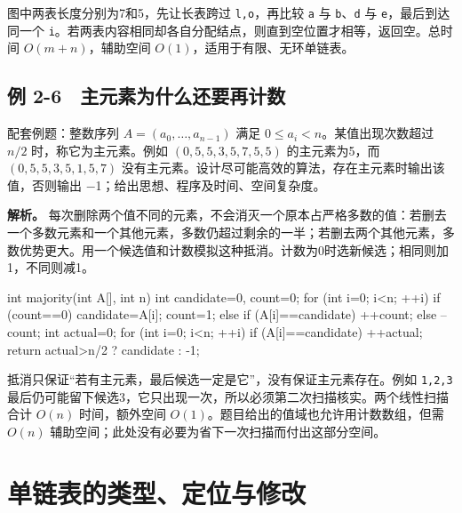 图中两表长度分别为7和5，先让长表跨过 \texttt{l,\allowbreak{}o}，再比较 \texttt{a} 与 \texttt{b}、\texttt{d} 与 \texttt{e}，最后到达同一个 \texttt{i}。若两表内容相同却各自分配结点，则直到空位置才相等，返回空。总时间 \(O(m+n)\)，辅助空间 \(O(1)\)，适用于有限、无环单链表。

\subsection{例 2-6　主元素为什么还要再计数}\label{DS02-ex6}

\begin{example}[配套例题]

配套例题：整数序列 \(A=(a_0,\ldots,a_{n-1})\) 满足 \(0\le a_i<n\)。某值出现次数超过 \(n/2\) 时，称它为主元素。例如 \((0,5,5,3,5,7,5,5)\) 的主元素为5，而 \((0,5,5,3,5,1,5,7)\) 没有主元素。设计尽可能高效的算法，存在主元素时输出该值，否则输出 \ensuremath{-}1；给出思想、程序及时间、空间复杂度。

\end{example}

\textbf{解析。} 每次删除两个值不同的元素，不会消灭一个原本占严格多数的值：若删去一个多数元素和一个其他元素，多数仍超过剩余的一半；若删去两个其他元素，多数优势更大。用一个候选值和计数模拟这种抵消。计数为0时选新候选；相同则加1，不同则减1。

\par\medskip\noindent\begin{minipage}{\linewidth}
\begin{codeblock}[language=C]
int majority(int A[], int n) {
    int candidate=0, count=0;
    for (int i=0; i<n; ++i) {
        if (count==0) { candidate=A[i]; count=1; }
        else if (A[i]==candidate) ++count;
        else --count;
    }
    int actual=0;
    for (int i=0; i<n; ++i)
        if (A[i]==candidate) ++actual;
    return actual>n/2 ? candidate : -1;
}
\end{codeblock}
\end{minipage}\par\medskip

抵消只保证``若有主元素，最后候选一定是它''，没有保证主元素存在。例如 \texttt{1,\allowbreak{}2,\allowbreak{}3} 最后仍可能留下候选3，它只出现一次，所以必须第二次扫描核实。两个线性扫描合计 \(O(n)\) 时间，额外空间 \(O(1)\)。题目给出的值域也允许用计数数组，但需 \(O(n)\) 辅助空间；此处没有必要为省下一次扫描而付出这部分空间。

\section{单链表的类型、定位与修改}\label{DS02-code-link}

